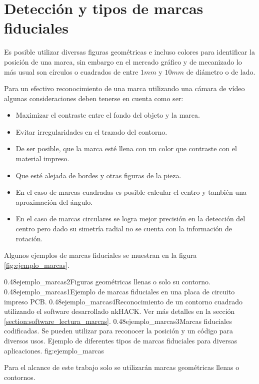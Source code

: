 \section{Detección y tipos de marcas fiduciales}
   Es posible utilizar diversas figuras geométricas e incluso colores para identificar la posición de una marca, sin embargo en el mercado gráfico y de mecanizado lo más usual son círculos o cuadrados de entre $1mm$ y $10mm$ de diámetro o de lado.\par
   Para un efectivo reconocimiento de una marca utilizando una cámara de vídeo algunas consideraciones deben tenerse en cuenta como ser:
   \begin{itemize}
      \item{Maximizar el contraste entre el fondo del objeto y la marca.}
      \item{Evitar irregularidades en el trazado del contorno.}
      \item{De ser posible, que la marca esté llena con un color que contraste con el material impreso.}
      \item{Que esté alejada de bordes y otras figuras de la pieza.}
      \item{En el caso de marcas cuadradas es posible calcular el centro y también una aproximación del ángulo.}
      \item{En el caso de marcas circulares se logra mejor precisión en la detección del centro pero dado su simetría radial no se cuenta con la información de rotación.}
   \end{itemize}
   Algunos ejemplos de marcas fiduciales se muestran en la figura \ref{fig:ejemplo_marcas}.

\subfigtwotwo
            {0.48}{ejemplo_marcas2}{Figuras geométricas llenas o solo su contorno.} 
            {0.48}{ejemplo_marcas1}{Ejemplo de marcas fiduciales en una placa de circuito impreso PCB.}
            {0.48}{ejemplo_marcas4}{Reconocimiento de un contorno cuadrado utilizando el software desarrollado nkHACK. Ver más detalles en la sección \ref{section:software_lectura_marcas}.}
            {0.48}{ejemplo_marcas3}{Marcas fiduciales codificadas. Se pueden utilizar para reconocer la posición y un código para diversos usos.}
            {Ejemplo de diferentes tipos de marcas fiduciales para diversas aplicaciones.}
            {fig:ejemplo_marcas}

         Para el alcance de este trabajo solo se utilizarán marcas geométricas llenas o contornos.


